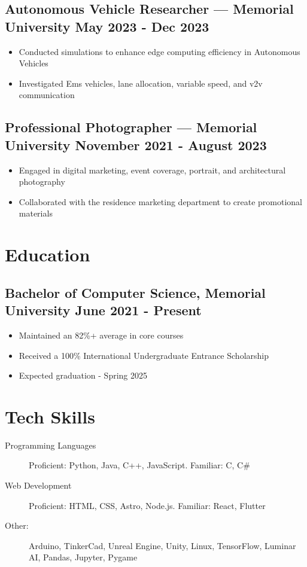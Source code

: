 \documentclass[10pt]{article}
\begin{document}
\subsection{Autonomous Vehicle Researcher — Memorial University \hfill May 2023 - Dec 2023}
\begin{itemize}
    \item Conducted simulations to enhance edge computing efficiency in Autonomous Vehicles
    \item Investigated Ems vehicles, lane allocation, variable speed, and v2v communication
\end{itemize}

\subsection{Professional Photographer — Memorial University \hfill November 2021 - August 2023}
\begin{itemize}
    \item Engaged in digital marketing, event coverage, portrait, and architectural photography
    \item Collaborated with the residence marketing department to create promotional materials
\end{itemize}

\section{Education}
\subsection{Bachelor of Computer Science, Memorial University \hfill June 2021 - Present}
\begin{itemize}
    \item Maintained an 82\%+ average in core courses
    \item Received a 100\% International Undergraduate Entrance Scholarship
    \item Expected graduation - Spring 2025
    
\end{itemize}

\section{Tech Skills}
\begin{description}
    \item[Programming Languages] Proficient: Python, Java, C++, JavaScript. Familiar: C, C\#
    \item[Web Development] Proficient: HTML, CSS, Astro, Node.js. Familiar: React, Flutter
    \item[Other:] Arduino, TinkerCad, Unreal Engine, Unity, Linux, TensorFlow, Luminar AI, Pandas, Jupyter, Pygame
\end{description}
\end{document}
